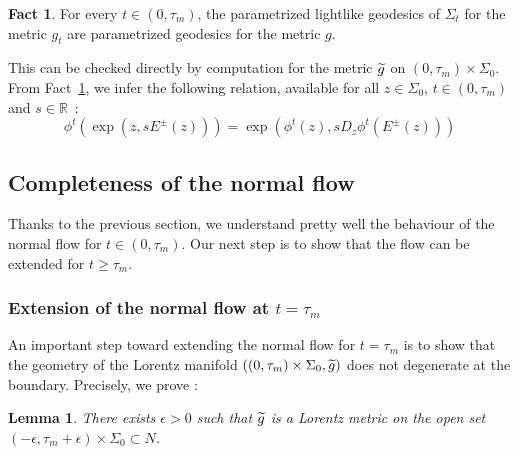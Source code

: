 \documentclass[11pt]{article}
\newtheorem{lemm}[theo]{Lemma}
\theoremstyle{definition}
\numberwithin{equation}{section}
\numberwithin{figure}{section}
\numberwithin{table}{section}
\newtheorem{fact}[theo]{Fact} }
\newcommand*\RR{\mathbb{R}}
\let\oldtilde\tilde
\renewcommand*\tilde[1]{\mathchoice{\widetilde{#1}}{\widetilde{#1}}{\widetilde{#1}}{\oldtilde{#1}}}
\begin{document}
\begin{fact}\label{fait.lightlike.geodesics}
For every $t \in (0,\tau_m)$, the parametrized lightlike geodesics of $\Sigma_t$ for the metric $g_t$ are parametrized geodesics for the metric $g$.
\end{fact}


This can be checked directly by computation for the metric $\tilde{g}$ on $(0,\tau_m) \times \Sigma_0$. From Fact~\ref{fait.lightlike.geodesics}, we infer the following relation, available for all $z \in \Sigma_0$, $t \in (0,\tau_m)$ and $s \in \RR$~:
\begin{equation}\label{eq.equivariance2}
\phi^t(\exp(z,sE^{\pm}(z)))=\exp(\phi^t(z),sD_z\phi^t(E^{\pm}(z)))
\end{equation}


\subsection{Completeness of the normal flow}
Thanks to the previous section, we understand pretty well the behaviour of the normal flow for $t \in (0,\tau_m)$. Our next step is to show that the flow can be extended for $t \geq \tau_m$.


\subsubsection{Extension of the normal flow at \texorpdfstring{$t=\tau_m$}{t= taum}} An important step toward extending the normal flow for $t=\tau_m$ is to show that the geometry of the Lorentz manifold $((0,\tau_m) \times \Sigma_0, \tilde{g})$ does not degenerate at the boundary. Precisely, we prove :

\begin{lemm}\label{lem.nondegeneracy}
There exists $\epsilon >0$ such that $\tilde{g}$ is a Lorentz metric on the open set $(- \epsilon, \tau_m+\epsilon) \times \Sigma_0 \subset N$.
\end{lemm}
\end{document}

